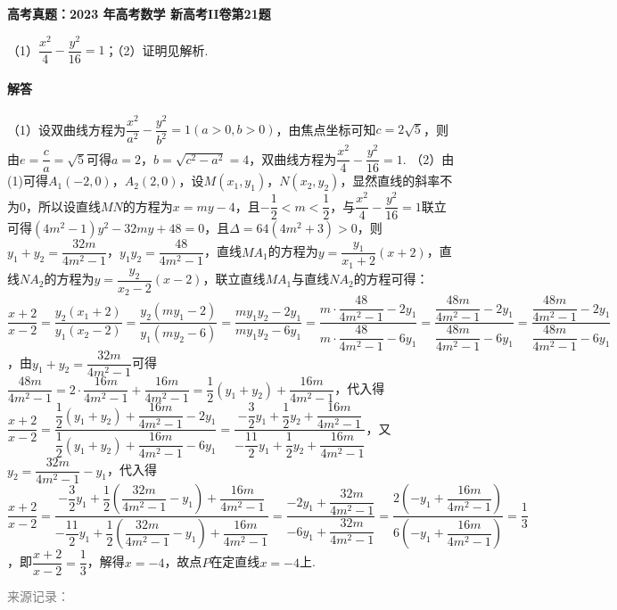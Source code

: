 \documentclass[UTF8,a4paper,11pt]{ctexart}
\newenvironment{gaokao}[1]{\par\medskip\noindent\textbf{高考真题：#1}\par\smallskip}{\par\medskip}
\begin{document}
\begin{gaokao}{2023 年高考数学 新高考II卷第21题}
（1）$\dfrac{x^{2}}{4}-\dfrac{y^{2}}{16}=1$；（2）证明见解析.

\paragraph{解答}

（1）设双曲线方程为$\dfrac{x^{2}}{a^{2}}-\dfrac{y^{2}}{b^{2}}=1(a>0,b>0)$，由焦点坐标可知$c=2\sqrt{5}$，则由$e=\dfrac{c}{a}=\sqrt{5}$可得$a=2$，$b=\sqrt{c^{2}-a^{2}}=4$，双曲线方程为$\dfrac{x^{2}}{4}-\dfrac{y^{2}}{16}=1$.
（2）由(1)可得$A_{1}(-2,0)$，$A_{2}(2,0)$，设$M(x_{1},y_{1})$，$N(x_{2},y_{2})$，显然直线的斜率不为$0$，所以设直线$MN$的方程为$x=my-4$，且$-\dfrac{1}{2}<m<\dfrac{1}{2}$，与$\dfrac{x^{2}}{4}-\dfrac{y^{2}}{16}=1$联立可得$(4m^{2}-1)y^{2}-32my+48=0$，且$\Delta=64(4m^{2}+3)>0$，则$y_{1}+y_{2}=\dfrac{32m}{4m^{2}-1}$，$y_{1}y_{2}=\dfrac{48}{4m^{2}-1}$，直线$MA_{1}$的方程为$y=\dfrac{y_{1}}{x_{1}+2}(x+2)$，直线$NA_{2}$的方程为$y=\dfrac{y_{2}}{x_{2}-2}(x-2)$，联立直线$MA_{1}$与直线$NA_{2}$的方程可得：$\dfrac{x+2}{x-2}=\dfrac{y_{2}(x_{1}+2)}{y_{1}(x_{2}-2)}=\dfrac{y_{2}(my_{1}-2)}{y_{1}(my_{2}-6)}=\dfrac{my_{1}y_{2}-2y_{1}}{my_{1}y_{2}-6y_{1}}=\dfrac{m\cdot\dfrac{48}{4m^{2}-1}-2y_{1}}{m\cdot\dfrac{48}{4m^{2}-1}-6y_{1}}=\dfrac{\dfrac{48m}{4m^{2}-1}-2y_{1}}{\dfrac{48m}{4m^{2}-1}-6y_{1}}=\dfrac{\dfrac{48m}{4m^{2}-1}-2y_{1}}{\dfrac{48m}{4m^{2}-1}-6y_{1}}$，由$y_{1}+y_{2}=\dfrac{32m}{4m^{2}-1}$可得$\dfrac{48m}{4m^{2}-1}=2\cdot\dfrac{16m}{4m^{2}-1}+\dfrac{16m}{4m^{2}-1}=\dfrac{1}{2}(y_{1}+y_{2})+\dfrac{16m}{4m^{2}-1}$，代入得$\dfrac{x+2}{x-2}=\dfrac{\dfrac{1}{2}(y_{1}+y_{2})+\dfrac{16m}{4m^{2}-1}-2y_{1}}{\dfrac{1}{2}(y_{1}+y_{2})+\dfrac{16m}{4m^{2}-1}-6y_{1}}=\dfrac{-\dfrac{3}{2}y_{1}+\dfrac{1}{2}y_{2}+\dfrac{16m}{4m^{2}-1}}{-\dfrac{11}{2}y_{1}+\dfrac{1}{2}y_{2}+\dfrac{16m}{4m^{2}-1}}$，又$y_{2}=\dfrac{32m}{4m^{2}-1}-y_{1}$，代入得$\dfrac{x+2}{x-2}=\dfrac{-\dfrac{3}{2}y_{1}+\dfrac{1}{2}(\dfrac{32m}{4m^{2}-1}-y_{1})+\dfrac{16m}{4m^{2}-1}}{-\dfrac{11}{2}y_{1}+\dfrac{1}{2}(\dfrac{32m}{4m^{2}-1}-y_{1})+\dfrac{16m}{4m^{2}-1}}=\dfrac{-2y_{1}+\dfrac{32m}{4m^{2}-1}}{-6y_{1}+\dfrac{32m}{4m^{2}-1}}=\dfrac{2(-y_{1}+\dfrac{16m}{4m^{2}-1})}{6(-y_{1}+\dfrac{16m}{4m^{2}-1})}=\dfrac{1}{3}$，即$\dfrac{x+2}{x-2}=\dfrac{1}{3}$，解得$x=-4$，故点$P$在定直线$x=-4$上.

\par\smallskip\textcolor{gray}{\footnotesize 来源记录：\texttt{}}

\end{gaokao}
\end{document}
